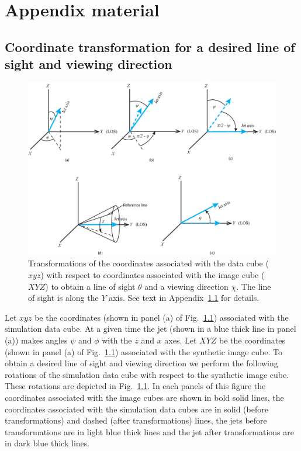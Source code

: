 \chapter{Appendix material}

\section{Coordinate transformation for a desired line of sight and viewing direction}\label{A:trans}
\begin{figure}
\centering
\includegraphics[width=\textwidth]{fig9.eps}
\caption{Transformations of the coordinates associated with the data cube ($xyz$) with respect to coordinates associated with the image cube ($XYZ$) to obtain a line of sight $\theta$ and a viewing direction $\chi$. The line of sight is along the $Y$ axis. See text in Appendix~\ref{A:trans} for details.  }
\label{f:rot}
\end{figure}
Let $xyz$ be the coordinates (shown in panel (a) of Fig.~\ref{f:rot}) associated with the simulation data cube. At a given time the jet (shown in a blue thick line in panel (a)) makes angles $\psi$ and $\phi$ with the $z$ and $x$ axes. Let $XYZ$ be the coordinates (shown in panel (a) of Fig.~\ref{f:rot}) associated with the synthetic image cube. 
To obtain a desired line of sight and viewing direction we perform the following rotations of the simulation data cube with respect to the synthetic image cube. These rotations are depicted in Fig.~\ref{f:rot}. In each panels of this figure the coordinates associated with the image cubes are shown in bold solid lines, the coordinates associated with the simulation data cubes are in solid (before transformations) and dashed (after transformations) lines, the jets before transformations are in light blue thick lines and the jet after transformations are in dark blue thick lines. 
